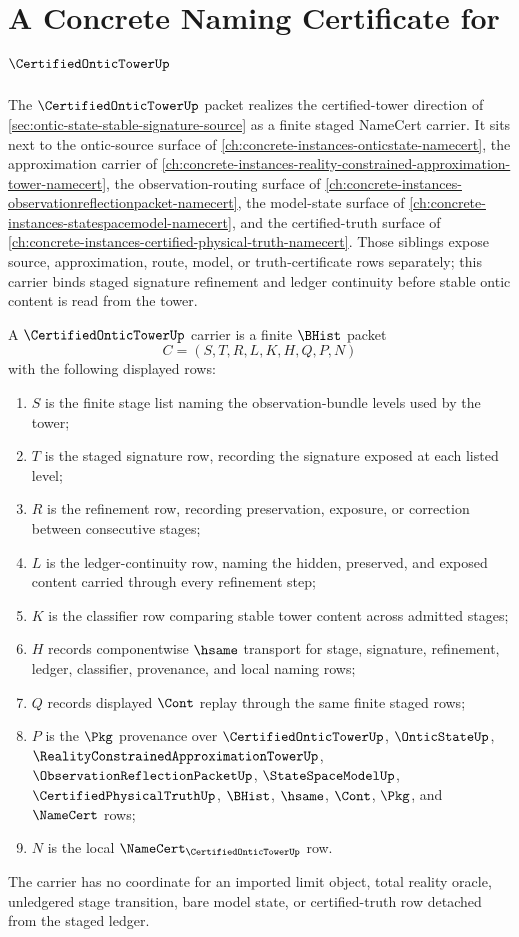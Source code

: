 \chapter{A Concrete Naming Certificate for $\CertifiedOnticTowerUp$}
\label{ch:concrete-instances-certifiedontictower-namecert}

The $\CertifiedOnticTowerUp$ packet realizes the certified-tower direction of \autoref{sec:ontic-state-stable-signature-source} as a finite staged NameCert carrier. It sits next to the ontic-source surface of \autoref{ch:concrete-instances-onticstate-namecert}, the approximation carrier of \autoref{ch:concrete-instances-reality-constrained-approximation-tower-namecert}, the observation-routing surface of \autoref{ch:concrete-instances-observationreflectionpacket-namecert}, the model-state surface of \autoref{ch:concrete-instances-statespacemodel-namecert}, and the certified-truth surface of \autoref{ch:concrete-instances-certified-physical-truth-namecert}. Those siblings expose source, approximation, route, model, or truth-certificate rows separately; this carrier binds staged signature refinement and ledger continuity before stable ontic content is read from the tower.

\begin{definition}
\label{def:certified-ontic-tower-carrier}
A $\CertifiedOnticTowerUp$ carrier is a finite $\BHist$ packet
$$
C=(S,T,R,L,K,H,Q,P,N)
$$
with the following displayed rows:
\begin{enumerate}
\item $S$ is the finite stage list naming the observation-bundle levels used by the tower;
\item $T$ is the staged signature row, recording the signature exposed at each listed level;
\item $R$ is the refinement row, recording preservation, exposure, or correction between consecutive stages;
\item $L$ is the ledger-continuity row, naming the hidden, preserved, and exposed content carried through every refinement step;
\item $K$ is the classifier row comparing stable tower content across admitted stages;
\item $H$ records componentwise $\hsame$ transport for stage, signature, refinement, ledger, classifier, provenance, and local naming rows;
\item $Q$ records displayed $\Cont$ replay through the same finite staged rows;
\item $P$ is the $\Pkg$ provenance over $\CertifiedOnticTowerUp$, $\OnticStateUp$, $\RealityConstrainedApproximationTowerUp$, $\ObservationReflectionPacketUp$, $\StateSpaceModelUp$, $\CertifiedPhysicalTruthUp$, $\BHist$, $\hsame$, $\Cont$, $\Pkg$, and $\NameCert$ rows;
\item $N$ is the local $\NameCert_{\CertifiedOnticTowerUp}$ row.
\end{enumerate}
The carrier has no coordinate for an imported limit object, total reality oracle, unledgered stage transition, bare model state, or certified-truth row detached from the staged ledger.
\end{definition}


